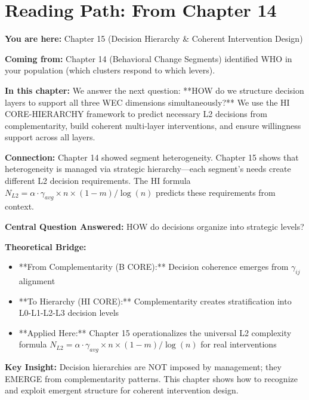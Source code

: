 \documentclass[11pt, a4paper]{article}
\begin{document}
\section*{Reading Path: From Chapter 14}

\begin{tcolorbox}[colback=blue!10!white, colframe=blue!75!black, title=Reading Path: From Chapter 14 (BCS)]

\textbf{You are here:} Chapter 15 (Decision Hierarchy \& Coherent Intervention Design)

\textbf{Coming from:} Chapter 14 (Behavioral Change Segments) identified WHO in your population (which clusters respond to which levers).

\textbf{In this chapter:} We answer the next question: **HOW do we structure decision layers to support all three WEC dimensions simultaneously?** We use the HI CORE-HIERARCHY framework to predict necessary L2 decisions from complementarity, build coherent multi-layer interventions, and ensure willingness support across all layers.

\textbf{Connection:} Chapter 14 showed segment heterogeneity. Chapter 15 shows that heterogeneity is managed via strategic hierarchy---each segment's needs create different L2 decision requirements. The HI formula $N_{L2} = \alpha \cdot \gamma_{avg} \times n \times (1-m) / \log(n)$ predicts these requirements from context.

\end{tcolorbox}


\begin{tcolorbox}[colback=purple!5!white, colframe=purple!75!black, title=CORE Connection: HI (Decision Hierarchy)]
\textbf{Central Question Answered:} HOW do decisions organize into strategic levels?

\textbf{Theoretical Bridge:}
\begin{itemize}[nosep]
    \item **From Complementarity (B CORE):** Decision coherence emerges from $\gamma_{ij}$ alignment
    \item **To Hierarchy (HI CORE):** Complementarity creates stratification into L0-L1-L2-L3 decision levels
    \item **Applied Here:** Chapter 15 operationalizes the universal L2 complexity formula $N_{L2} = \alpha \cdot \gamma_{avg} \times n \times (1-m) / \log(n)$ for real interventions
\end{itemize}

\textbf{Key Insight:} Decision hierarchies are NOT imposed by management; they EMERGE from complementarity patterns. This chapter shows how to recognize and exploit emergent structure for coherent intervention design.

\end{tcolorbox}
\end{document}
